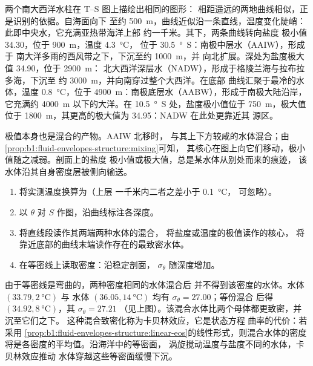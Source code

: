 两个南大西洋水柱在 T--S 图上描绘出相同的图形：
相距遥远的两地曲线相似，正是识别的依据。自海面向下
至约 \qty{500}{m}，曲线近似沿一条直线，温度变化陡峭：
此即中央水，它充满亚热带海洋上部
约一千米。其下，两条曲线转向盐度
极小值 \num{34.30}，位于 \qty{900}{m}，温度 \qty{4.3}{\celsius}，
位于 \qty{30.5}{\degree S}：南极中层水（AAIW），形成于
南大洋多雨的西风带之下，下沉至约 \qty{1000}{m}，并
向北扩展。深处为盐度极大值 \num{34.90}，位于 \qty{2900}{m}：
北大西洋深层水（NADW），形成于格陵兰海与拉布拉多海，下沉至
约 \qty{3000}{m}，并向南穿过整个大西洋。在底部
曲线汇聚于最冷的水体，温度 \qty{0.8}{\celsius}，位于
\qty{4900}{m}：南极底层水（AABW），形成于南极大陆沿岸，
它充满约 \qty{4000}{m} 以下的大洋。在
\qty{10.5}{\degree S} 处，盐度极小值位于 \qty{750}{m}，极大值
位于 \qty{1800}{m}，其更高的极大值为 \num{34.95}：NADW 在此处更靠近其
源区。

极值本身也是混合的产物。AAIW 北移时，
与其上下方较咸的水体混合；由\cref{prop:b1:fluid-envelopes-structure:mixing}可知，
其核心在图上向它们移动，极小值随之减弱。剖面上的盐度
极小值或极大值，总是某水体从别处而来的痕迹，
该水体沿其自身密度层被侧向输送。

\begin{method}[在 T--S 图上读取水团]\label{met:b1:fluid-envelopes-structure:ts}
\begin{enumerate}
  \item 将实测温度换算为（上层
        一千米内二者之差小于 \qty{0.1}{\celsius}，
        可忽略）。
  \item 以 $\theta$ 对 $S$ 作图，沿曲线标注各深度。
  \item 将直线段读作其两端两种水体的混合，
        将盐度或温度的极值读作的核心，
        将靠近底部的曲线末端读作存在的最致密水体。
  \item 在等密线上读取密度：沿稳定剖面，
        $\sigma_\theta$ 随深度增加。
\end{enumerate}
\end{method}

由于等密线是弯曲的，两种密度相同的水体混合后
并不得到该密度的水体。水体 $(33.79, \qty{2}{\celsius})$ 与
水体 $(36.05, \qty{14}{\celsius})$ 均有 $\sigma_\theta = 27.00$；等份混合
后得 $(34.92, \qty{8}{\celsius})$，其 $\sigma_\theta = 27.21$
（见上图）。该混合水体比两个母体都更致密，并沉至它们之下。
这种混合致密化称为卡贝林效应，它是状态方程
曲率的代价：若采用
\cref{prop:b1:fluid-envelopes-structure:linear-eos}的线性形式，则混合水体的密度
将是各密度的平均值。沿海洋中的等密面，
涡旋搅动温度与盐度不同的水体，卡贝林效应推动
水体穿越这些等密面缓慢下沉。

